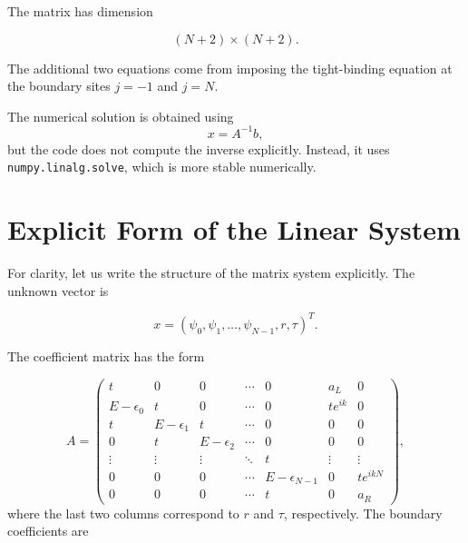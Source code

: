 The matrix has dimension

\begin{equation}
	(N+2)\times(N+2).
\end{equation}

The additional two equations come from imposing the tight-binding
equation at the boundary sites $j=-1$ and $j=N$.

The numerical solution is obtained using
\begin{equation}
	x = A^{-1}b,
\end{equation}
but the code does not compute the inverse explicitly. Instead, it uses
\texttt{numpy.linalg.solve}, which is more stable numerically.

\section{Explicit Form of the Linear System}

For clarity, let us write the structure of the matrix system explicitly.
The unknown vector is

\begin{equation}
	x
	=
	(\psi_0,\psi_1,\ldots,\psi_{N-1},r,\tau)^T.
\end{equation}

The coefficient matrix has the form

\begin{equation}
	A
	=
	\begin{pmatrix}
		t            & 0            & 0            & \cdots & 0                & a_L      & 0         \\
		E-\epsilon_0 & t            & 0            & \cdots & 0                & t e^{ik} & 0         \\
		t            & E-\epsilon_1 & t            & \cdots & 0                & 0        & 0         \\
		0            & t            & E-\epsilon_2 & \cdots & 0                & 0        & 0         \\
		\vdots       & \vdots       & \vdots       & \ddots & t                & \vdots   & \vdots    \\
		0            & 0            & 0            & \cdots & E-\epsilon_{N-1} & 0        & t e^{ikN} \\
		0            & 0            & 0            & \cdots & t                & 0        & a_R
	\end{pmatrix},
	\label{eq:explicit-A}
\end{equation}
where the last two columns correspond to $r$ and $\tau$, respectively.
The boundary coefficients are


